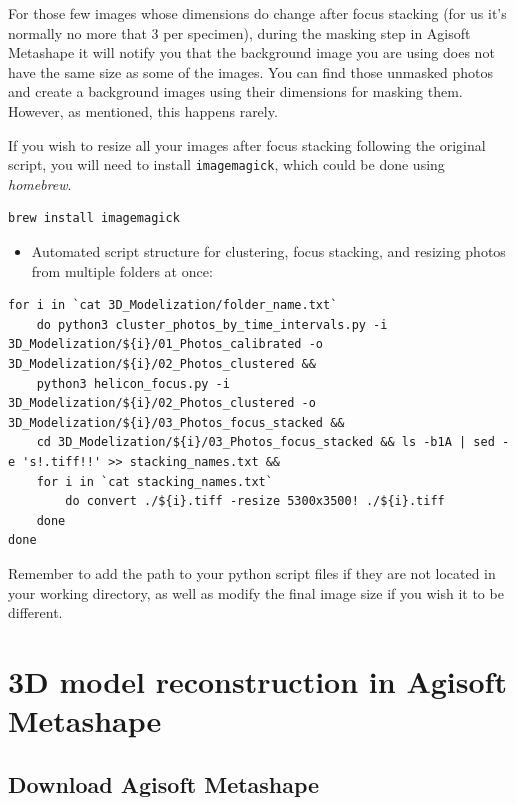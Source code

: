 \documentclass[
]{book}
\providecommand{\tightlist}{%
  \setlength{\itemsep}{0pt}\setlength{\parskip}{0pt}}
\begin{document}
For those few images whose dimensions do change after focus stacking (for us it's
normally no more that 3 per specimen), during the masking step in Agisoft Metashape
it will notify you that the background image you are using does not have the same
size as some of the images. You can find those unmasked photos and create a background
images using their dimensions for masking them. However, as mentioned, this happens
rarely.

If you wish to resize all your images after focus stacking following the original script,
you will need to install \texttt{imagemagick}, which could be done using \emph{homebrew}.

\begin{verbatim}
brew install imagemagick
\end{verbatim}

\begin{itemize}
\tightlist
\item
  Automated script structure for clustering, focus stacking, and resizing photos from multiple folders at once:
\end{itemize}

\begin{verbatim}
for i in `cat 3D_Modelization/folder_name.txt`
    do python3 cluster_photos_by_time_intervals.py -i 3D_Modelization/${i}/01_Photos_calibrated -o 3D_Modelization/${i}/02_Photos_clustered &&
    python3 helicon_focus.py -i 3D_Modelization/${i}/02_Photos_clustered -o 3D_Modelization/${i}/03_Photos_focus_stacked &&
    cd 3D_Modelization/${i}/03_Photos_focus_stacked && ls -b1A | sed -e 's!.tiff!!' >> stacking_names.txt &&
    for i in `cat stacking_names.txt`
        do convert ./${i}.tiff -resize 5300x3500! ./${i}.tiff
    done
done
\end{verbatim}

Remember to add the path to your python script files if they are not located in your
working directory, as well as modify the final image size if you wish it to be
different.

\hypertarget{d-model-reconstruction-in-agisoft-metashape}{%
\chapter{3D model reconstruction in Agisoft Metashape}\label{d-model-reconstruction-in-agisoft-metashape}}

\hypertarget{download-agisoft-metashape}{%
\section{Download Agisoft Metashape}\label{download-agisoft-metashape}}
\end{document}
